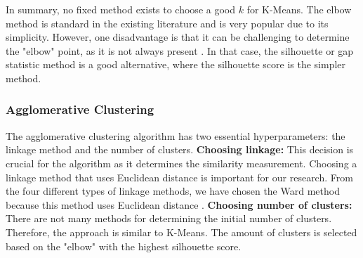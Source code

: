 In summary, no fixed method exists to choose a good $k$ for K-Means.
The elbow method is standard in the existing literature and is very popular due to its simplicity.
However, one disadvantage is that it can be challenging to determine the "elbow" point, as it is not always present \citep{kodinariya_review_2013}.
In that case, the silhouette or gap statistic method is a good alternative, where the silhouette score is the simpler method.
\subsubsection{Agglomerative Clustering} \label{theory:clustering-agglomerative}
The agglomerative clustering algorithm has two essential hyperparameters: the linkage method and the number of clusters. \newline
\textbf{Choosing linkage:}
This decision is crucial for the algorithm as it determines the similarity measurement.
Choosing a linkage method that uses Euclidean distance is important for our research.
From the four different types of linkage methods, we have chosen the Ward method because this method uses Euclidean distance \citep{roux_comparative_2015,seetharaman_brief_2019}. \newline
\textbf{Choosing number of clusters:}
There are not many methods for determining the initial number of clusters.
Therefore, the approach is similar to K-Means.
The amount of clusters is selected based on the "elbow" with the highest silhouette score.

